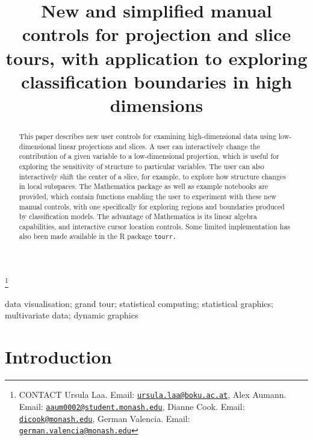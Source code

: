 \documentclass[]{interact}
\theoremstyle{plain}%
\theoremstyle{definition}
\theoremstyle{remark}
\begin{document}
\articletype{}

\title{New and simplified manual controls for projection and slice
tours, with application to exploring classification boundaries in high
dimensions}


\author{
}

\thanks{CONTACT Ursula
Laa. Email: \href{mailto:ursula.laa@boku.ac.at}{\nolinkurl{ursula.laa@boku.ac.at}}, Alex
Aumann. Email: \href{mailto:aaum0002@student.monash.edu}{\nolinkurl{aaum0002@student.monash.edu}}, Dianne
Cook. Email: \href{mailto:dicook@monash.edu}{\nolinkurl{dicook@monash.edu}}, German
Valencia. Email: \href{mailto:german.valencia@monash.edu}{\nolinkurl{german.valencia@monash.edu}}}

\maketitle

\begin{abstract}
This paper describes new user controls for examining high-dimensional
data using low-dimensional linear projections and slices. A user can
interactively change the contribution of a given variable to a
low-dimensional projection, which is useful for exploring the
sensitivity of structure to particular variables. The user can also
interactively shift the center of a slice, for example, to explore how
structure changes in local subspaces. The Mathematica package as well as
example notebooks are provided, which contain functions enabling the
user to experiment with these new manual controls, with one specifically
for exploring regions and boundaries produced by classification models.
The advantage of Mathematica is its linear algebra capabilities, and
interactive cursor location controls. Some limited implementation has
also been made available in the R package \tt{tourr}. 
\end{abstract}

\begin{keywords}
data visualisation; grand tour; statistical computing; statistical
graphics; multivariate data; dynamic graphics
\end{keywords}

\hypertarget{introduction}{%
\section{Introduction}\label{introduction}}
\end{document}
